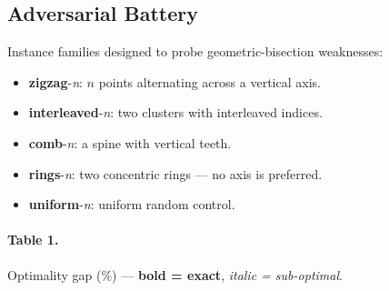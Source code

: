 \documentclass[11pt,a4paper]{article}
\begin{document}
\subsection{Adversarial Battery}

Instance families designed to probe geometric-bisection weaknesses:

\begin{itemize}
\item \textbf{zigzag}-\textit{n}: $n$ points alternating across a
vertical axis.
\item \textbf{interleaved}-\textit{n}: two clusters with interleaved
indices.
\item \textbf{comb}-\textit{n}: a spine with vertical teeth.
\item \textbf{rings}-\textit{n}: two concentric rings --- no axis is
preferred.
\item \textbf{uniform}-\textit{n}: uniform random control.
\end{itemize}

\paragraph{Table 1.} Optimality gap (\%) --- \textbf{bold = exact},
\textit{italic = sub-optimal}.
\end{document}
